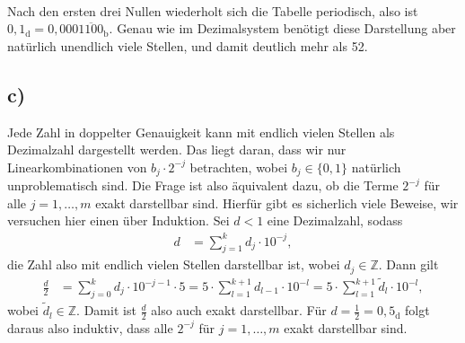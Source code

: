 \documentclass[english, parskip=full]{scrartcl}
\newcommand{\tecxt}{}
\begin{document}
\begin{table}[!ht]
\begin{tabular}{lccclc|c}
\end{tabular}
\end{table}
\\
Nach den ersten drei Nullen wiederholt sich die Tabelle periodisch, also ist $0,1_\tecxt\text{d} = 0,000\overline{1100}_\tecxt\text{b}$.
Genau wie im Dezimalsystem benötigt diese Darstellung aber natürlich unendlich viele Stellen, und damit deutlich mehr als 52.


\subsection*{c)}
Jede Zahl in doppelter Genauigkeit kann mit endlich vielen Stellen als Dezimalzahl dargestellt werden.
Das liegt daran, dass wir nur Linearkombinationen von $b_j\cdot 2^{-j}$ betrachten, wobei $b_j\in\{0,1\}$ natürlich unproblematisch sind.
Die Frage ist also äquivalent dazu, ob die Terme $2^{-j}$ für alle $j=1,\dots,m$ exakt darstellbar sind.
Hierfür gibt es sicherlich viele Beweise, wir versuchen hier einen über Induktion.
Sei $d < 1$ eine Dezimalzahl, sodass 
\begin{align}
d &= \sum_{j=1}^k d_j\cdot 10^{-j},
\end{align}
die Zahl also mit endlich vielen Stellen darstellbar ist, wobei $d_j\in\mathbb{Z}$.
Dann gilt 
\begin{align}
\frac{d}{2} &= \sum_{j=0}^k d_j\cdot 10^{-j-1} \cdot 5 = 5\cdot \sum_{l=1}^{k+1} d_{l-1}\cdot 10^{-l} = 5\cdot \sum_{l=1}^{k+1} \tilde{d}_{l}\cdot 10^{-l} ,
\end{align}
wobei $\tilde{d}_l\in\mathbb{Z}$.
Damit ist $\frac{d}{2}$ also auch exakt darstellbar.
Für $d=\frac{1}{2}=0,5_\tecxt\text{d}$ folgt daraus also induktiv, dass alle $2^{-j}$ für $j=1,\dots,m$ exakt darstellbar sind.


\end{document}
